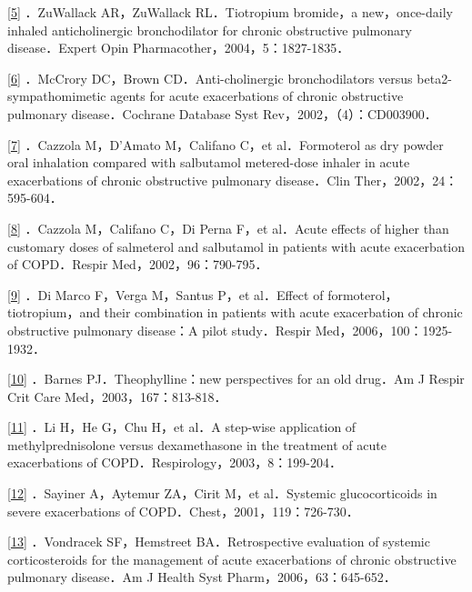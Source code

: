 \protect\hyperlink{text00012.htmlux5cux23ch5-11-back}{{[}5{]}}
．ZuWallack AR，ZuWallack RL．Tiotropium bromide，a new，once-daily
inhaled anticholinergic bronchodilator for chronic obstructive pulmonary
disease．Expert Opin Pharmacother，2004，5：1827-1835．

\protect\hyperlink{text00012.htmlux5cux23ch6-11-back}{{[}6{]}} ．McCrory
DC，Brown CD．Anti-cholinergic bronchodilators versus
beta2-sympathomimetic agents for acute exacerbations of chronic
obstructive pulmonary disease．Cochrane Database Syst
Rev，2002，（4）：CD003900．

\protect\hyperlink{text00012.htmlux5cux23ch7-11-back}{{[}7{]}} ．Cazzola
M，D'Amato M，Califano C，et al．Formoterol as dry powder oral
inhalation compared with salbutamol metered-dose inhaler in acute
exacerbations of chronic obstructive pulmonary disease．Clin
Ther，2002，24：595-604．

\protect\hyperlink{text00012.htmlux5cux23ch8-11-back}{{[}8{]}} ．Cazzola
M，Califano C，Di Perna F，et al．Acute effects of higher than customary
doses of salmeterol and salbutamol in patients with acute exacerbation
of COPD．Respir Med，2002，96：790-795．

\protect\hyperlink{text00012.htmlux5cux23ch9-11-back}{{[}9{]}} ．Di
Marco F，Verga M，Santus P，et al．Effect of formoterol，tiotropium，and
their combination in patients with acute exacerbation of chronic
obstructive pulmonary disease：A pilot study．Respir
Med，2006，100：1925-1932．

\protect\hyperlink{text00012.htmlux5cux23ch10-11-back}{{[}10{]}}
．Barnes PJ．Theophylline：new perspectives for an old drug．Am J Respir
Crit Care Med，2003，167：813-818．

\protect\hyperlink{text00012.htmlux5cux23ch11-11-back}{{[}11{]}} ．Li
H，He G，Chu H，et al．A step-wise application of methylprednisolone
versus dexamethasone in the treatment of acute exacerbations of
COPD．Respirology，2003，8：199-204．

\protect\hyperlink{text00012.htmlux5cux23ch12-11-back}{{[}12{]}}
．Sayiner A，Aytemur ZA，Cirit M，et al．Systemic glucocorticoids in
severe exacerbations of COPD．Chest，2001，119：726-730．

\protect\hyperlink{text00012.htmlux5cux23ch13-11-back}{{[}13{]}}
．Vondracek SF，Hemstreet BA．Retrospective evaluation of systemic
corticosteroids for the management of acute exacerbations of chronic
obstructive pulmonary disease．Am J Health Syst
Pharm，2006，63：645-652．

